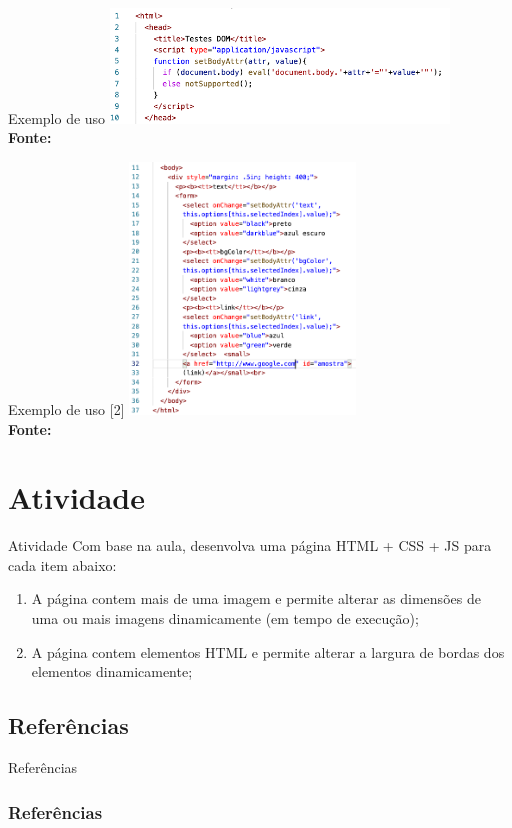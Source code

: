 \documentclass{beamer}
\begin{document}
    \begin{frame}{Exemplo de uso}
    \centering
	\includegraphics[width=90mm]{aulas/resources/aula3_js_2.png}\\
            \tiny{\textbf{Fonte:} \cite{moziladev2022}}
    \end{frame}
    \begin{frame}{Exemplo de uso [2]}
    \centering
	\includegraphics[width=60mm]{aulas/resources/aula3_js_3.png}\\
            \tiny{\textbf{Fonte:} \cite{moziladev2022}}
    \end{frame}
   \section{Atividade} 
   \begin{frame}{Atividade}
	Com base na aula, desenvolva uma página HTML + CSS + JS para cada item abaixo:
	\begin{enumerate}
	    \item  A página contem mais de uma imagem e permite alterar as dimensões de uma ou mais imagens dinamicamente (em tempo de execução);
	    \item A página contem elementos HTML e permite alterar a largura de bordas dos elementos dinamicamente;
	\end{enumerate}
	
    \end{frame}
   \subsection{Referências}
    \begin{frame}{Referências}%
\frametitle{Referências}
\small
\begin{center}
\tiny


\end{center}
\end{frame}
\end{document}

